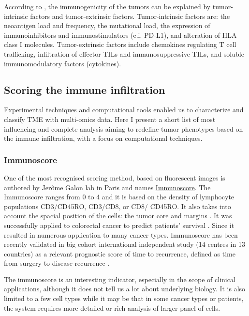 \documentclass[12pt,]{book}
\theoremstyle{definition}
\theoremstyle{definition}
\theoremstyle{definition}
\theoremstyle{remark}
\begin{document}
According to \citet{Gajewski2006}, the immunogenicity of the tumors can
be explained by tumor-intrinsic factors and tumor-extrinsic factors.
Tumor-intrinsic factors are: the neoantigen load and frequency, the
mutational load, the expression of immunoinhibitors and
immunostimulators (e.i. PD-L1), and alteration of HLA class I molecules.
Tumor-extrinsic factors include chemokines regulating T cell
trafficking, infiltration of effector TILs and immunosuppressive TILs,
and soluble immunomodulatory factors (cytokines).

\hypertarget{scoring-the-immune-infiltration}{%
\subsection{Scoring the immune
infiltration}\label{scoring-the-immune-infiltration}}

Experimental techniques and computational tools enabled us to
characterize and classify TME with multi-omics data. Here I present a
short list of most influencing and complete analysis aiming to redefine
tumor phenotypes based on the immune infiltration, with a focus on
computational techniques.

\hypertarget{immunoscore}{%
\subsubsection{Immunoscore}\label{immunoscore}}

One of the most recognised scoring method, based on fluorescent images
is authored by Jerôme Galon lab in Paris and names
\href{http://www.haliodx.com/clinical-research-services/immunoscorer/}{Immunoscore}.
The Immunoscore ranges from 0 to 4 and it is based on the density of
lymphocyte populations CD3/CD45RO, CD3/CD8, or CD8/ CD45RO. It also
takes into account the spacial position of the cells: the tumor core and
margins \citep{Galon2012}. It was successfully applied to colorectal
cancer to predict patients' survival \citep{Anitei2014} . Since it
resulted in numerous application to many cancer types. Immunoscore has
been recently validated in big cohort international independent study
(14 centres in 13 countries) as a relevant prognostic score of time to
recurrence, defined as time from surgery to disease recurrence
\citep{Pages2018}.

The immunoscore is an interesting indicator, especially in the scope of
clinical applications, although it does not tell us a lot about
underlying biology. It is also limited to a few cell types while it may
be that in some cancer types or patients, the system requires more
detailed or rich analysis of larger panel of cells.
\end{document}
